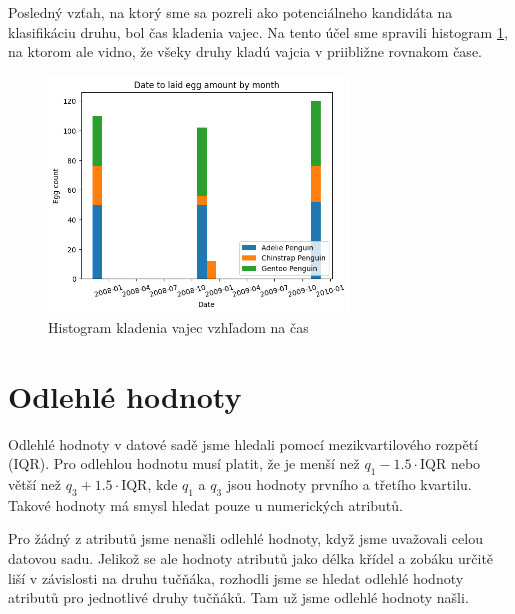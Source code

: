 \documentclass[10pt,xcolor=pdflatex,dvipsnames,table,oneside]{book}
\begin{document}
Posledný vzťah, na ktorý sme sa pozreli ako potenciálneho kandidáta na klasifikáciu druhu, bol čas kladenia vajec. Na tento účel sme spravili histogram \ref{fig:egg}, na ktorom ale vidno, že všeky druhy kladú vajcia v priibližne rovnakom čase.
\begin{figure}[h]
  \centering
  \includegraphics[width=8cm]{img/date_egg.png}
  \caption{Histogram kladenia vajec vzhľadom na čas}
  \label{fig:egg}
\end{figure}


\FloatBarrier
\section{Odlehlé hodnoty}
\label{sec:outliers}
Odlehlé hodnoty v datové sadě jsme hledali pomocí mezikvartilového rozpětí (IQR). Pro odlehlou hodnotu musí platit, že je menší než $q_1 - 1.5 \cdot \textrm{IQR}$ nebo větší než $q_3 + 1.5 \cdot \textrm{IQR}$, kde $q_1$ a $q_3$ jsou hodnoty prvního a třetího kvartilu. Takové hodnoty má smysl hledat pouze u numerických atributů.

Pro žádný z atributů jsme nenašli odlehlé hodnoty, když jsme uvažovali celou datovou sadu. Jelikož se ale hodnoty atributů jako délka křídel a zobáku určitě liší v závislosti na druhu tučňáka, rozhodli jsme se hledat odlehlé hodnoty atributů pro jednotlivé druhy tučňáků.
Tam už jsme odlehlé hodnoty našli.
\end{document}
